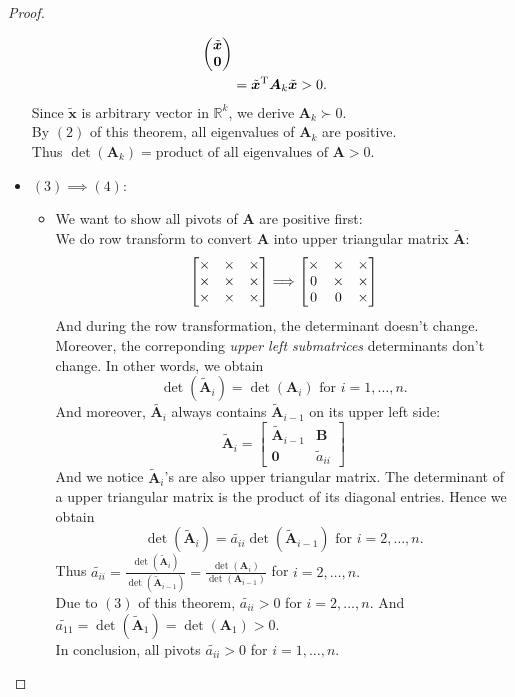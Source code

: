 \begin{proof}
\begin{itemize}
\begin{align*}
\begin{pmatrix}
\tilde{\bm x}\\\bm 0
\end{pmatrix}\\
&=\tilde{\bm x}^{\mathrm T}\bm A_k\tilde{\bm x}>0.
\end{align*}
Since $\tilde{\bm x}$ is arbitrary vector in $\mathbb{R}^{k}$, we derive $\bm A_k\succ0.$\\
By $(2)$ of this theorem, all eigenvalues of $\bm A_k$ are positive. \\ Thus $\det(\bm A_k)=\text{product of all eigenvalues of $\bm A$}>0.$
\item
$(3)\implies(4):$
\begin{itemize}
\item
We want to show all pivots of $\bm A$ are positive first:\\
We do row transform to convert $\bm A$ into upper triangular matrix $\tilde{\bm A}$:
\[
\begin{bmatrix}
\times&\times&\times\\
\times&\times&\times\\
\times&\times&\times
\end{bmatrix}\Longrightarrow
\begin{bmatrix}
\times&\times&\times\\
0&\times&\times\\
0&0&\times
\end{bmatrix}
\]
And during the row transformation, the determinant doesn't change. Moreover, the correponding \textit{upper left submatrices} determinants don't change. In other words, we obtain
\[
\det(\tilde{\bm A}_i)=\det(\bm A_i)\text{ for }i=1,\dots,n.
\]
And moreover, $\tilde{\bm A_i}$ always contains $\tilde{\bm A}_{i-1}$ on its upper left side:
\[
\tilde{\bm A}_i=\begin{bmatrix}
\tilde{\bm A}_{i-1}&\bm B\\\bm0&\tilde{a}_{ii}
\end{bmatrix}
\]
And we notice $\tilde{\bm A}_i$'s are also upper triangular matrix. The determinant of a upper triangular matrix is the product of its diagonal entries. Hence we obtain
\[
\det(\tilde{\bm A}_i)=\tilde{a_{ii}}\det(\tilde{\bm A}_{i-1})\text{ for }i=2,\dots,n.
\]
Thus $\tilde{a_{ii}}=\frac{\det(\tilde{\bm A}_i)}{\det(\tilde{\bm A}_{i-1})}=\frac{\det(\bm A_i)}{\det(\bm A_{i-1})}$ for $i=2,\dots,n.$\\ Due to $(3)$ of this theorem, $\tilde{a_{ii}}>0$ for $i=2,\dots,n.$ And $\tilde{a_{11}}=\det(\tilde{\bm A}_1)=\det(\bm A_1)>0$.\\
In conclusion, all pivots $\tilde{a_{ii}}>0$ for $i=1,\dots,n.$

\end{itemize}
\end{itemize}
\end{proof}
